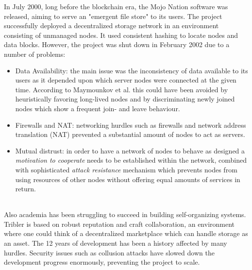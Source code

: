 \documentclass[conference]{IEEEtran}
\begin{document}
In July 2000, long before the blockchain era, the Mojo Nation software \cite{mojo-nation} was released, aiming to serve an "emergent file store" to its users.
The project successfully deployed a decentralized storage network in an environment consisting of unmanaged nodes.
It used consistent hashing \cite{consistent-hashing} to locate nodes and data blocks.
However, the project was shut down in February 2002 due to a number of problems:
\begin{itemize}
\item Data Availability: the main issue was the inconsistency of data available to its users as it depended upon which server nodes were connected at the given time.
According to Maymounkov et al.\cite{peer-to-peer-xor} this could have been avoided by heuristically favoring long-lived nodes and by discriminating newly joined nodes which show a frequent join- and leave behaviour.
\item Firewalls and NAT: networking hurdles such as firewalls and network address translation (NAT) prevented a substantial amount of nodes to act as servers.
\item Mutual distrust: in order to have a network of nodes to behave as designed a \textit{motivation to cooperate} needs to be established within the network, combined with sophisticated \textit{attack resistance} mechanism which prevents nodes from using resources of other nodes without offering equal amounts of services in return.
\end{itemize}
\hfill
\\
Also academia has been struggling to succeed in building self-organizing systems.
Tribler\cite{tribler} is based on robust reputation and craft collaboration, an environment where one could think of a decentralized marketplace which can handle storage as an asset.
The 12 years of development has been a history affected by many hurdles.
Security issues such as collusion attacks\cite{tribler-hurdles} have slowed down the development progress enormously, preventing the project to scale.
\end{document}
